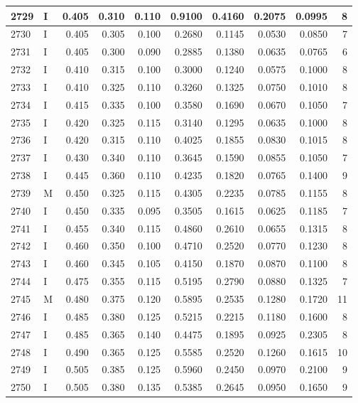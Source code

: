 \documentclass[9pt,twocolumn,twoside,]{pnas-new}
\begin{document}
\begin{tabular}{l|l|r|r|r|r|r|r|r|r}
\hline
2729 & I & 0.405 & 0.310 & 0.110 & 0.9100 & 0.4160 & 0.2075 & 0.0995 & 8\\
\hline
2730 & I & 0.405 & 0.305 & 0.100 & 0.2680 & 0.1145 & 0.0530 & 0.0850 & 7\\
\hline
2731 & I & 0.405 & 0.300 & 0.090 & 0.2885 & 0.1380 & 0.0635 & 0.0765 & 6\\
\hline
2732 & I & 0.410 & 0.315 & 0.100 & 0.3000 & 0.1240 & 0.0575 & 0.1000 & 8\\
\hline
2733 & I & 0.410 & 0.325 & 0.110 & 0.3260 & 0.1325 & 0.0750 & 0.1010 & 8\\
\hline
2734 & I & 0.415 & 0.335 & 0.100 & 0.3580 & 0.1690 & 0.0670 & 0.1050 & 7\\
\hline
2735 & I & 0.420 & 0.325 & 0.115 & 0.3140 & 0.1295 & 0.0635 & 0.1000 & 8\\
\hline
2736 & I & 0.420 & 0.315 & 0.110 & 0.4025 & 0.1855 & 0.0830 & 0.1015 & 8\\
\hline
2737 & I & 0.430 & 0.340 & 0.110 & 0.3645 & 0.1590 & 0.0855 & 0.1050 & 7\\
\hline
2738 & I & 0.445 & 0.360 & 0.110 & 0.4235 & 0.1820 & 0.0765 & 0.1400 & 9\\
\hline
2739 & M & 0.450 & 0.325 & 0.115 & 0.4305 & 0.2235 & 0.0785 & 0.1155 & 8\\
\hline
2740 & I & 0.450 & 0.335 & 0.095 & 0.3505 & 0.1615 & 0.0625 & 0.1185 & 7\\
\hline
2741 & I & 0.455 & 0.340 & 0.115 & 0.4860 & 0.2610 & 0.0655 & 0.1315 & 8\\
\hline
2742 & I & 0.460 & 0.350 & 0.100 & 0.4710 & 0.2520 & 0.0770 & 0.1230 & 8\\
\hline
2743 & I & 0.460 & 0.345 & 0.105 & 0.4150 & 0.1870 & 0.0870 & 0.1100 & 8\\
\hline
2744 & I & 0.475 & 0.355 & 0.115 & 0.5195 & 0.2790 & 0.0880 & 0.1325 & 7\\
\hline
2745 & M & 0.480 & 0.375 & 0.120 & 0.5895 & 0.2535 & 0.1280 & 0.1720 & 11\\
\hline
2746 & I & 0.485 & 0.380 & 0.125 & 0.5215 & 0.2215 & 0.1180 & 0.1600 & 8\\
\hline
2747 & I & 0.485 & 0.365 & 0.140 & 0.4475 & 0.1895 & 0.0925 & 0.2305 & 8\\
\hline
2748 & I & 0.490 & 0.365 & 0.125 & 0.5585 & 0.2520 & 0.1260 & 0.1615 & 10\\
\hline
2749 & I & 0.505 & 0.385 & 0.125 & 0.5960 & 0.2450 & 0.0970 & 0.2100 & 9\\
\hline
2750 & I & 0.505 & 0.380 & 0.135 & 0.5385 & 0.2645 & 0.0950 & 0.1650 & 9\\

\end{tabular}
\end{document}
